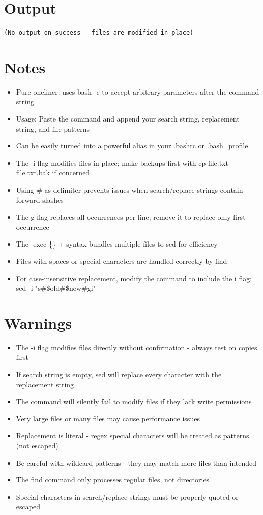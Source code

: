 \documentclass{article}
\begin{document}
\section*{Output}
\begin{lstlisting}
(No output on success - files are modified in place)
\end{lstlisting}

\section*{Notes}
\begin{itemize}
  \item Pure oneliner: uses bash -c to accept arbitrary parameters after the command string
  \item Usage: Paste the command and append your search string, replacement string, and file patterns
  \item Can be easily turned into a powerful alias in your .bashrc or .bash\_profile
  \item The -i flag modifies files in place; make backups first with cp file.txt file.txt.bak if concerned
  \item Using \# as delimiter prevents issues when search/replace strings contain forward slashes
  \item The g flag replaces all occurrences per line; remove it to replace only first occurrence
  \item The -exec \{\} + syntax bundles multiple files to sed for efficiency
  \item Files with spaces or special characters are handled correctly by find
  \item For case-insensitive replacement, modify the command to include the i flag: sed -i "s\#\$old\#\$new\#gi"
\end{itemize}

\section*{Warnings}
\begin{itemize}
  \item The -i flag modifies files directly without confirmation - always test on copies first
  \item If search string is empty, sed will replace every character with the replacement string
  \item The command will silently fail to modify files if they lack write permissions
  \item Very large files or many files may cause performance issues
  \item Replacement is literal - regex special characters will be treated as patterns (not escaped)
  \item Be careful with wildcard patterns - they may match more files than intended
  \item The find command only processes regular files, not directories
  \item Special characters in search/replace strings must be properly quoted or escaped
\end{itemize}
\end{document}
